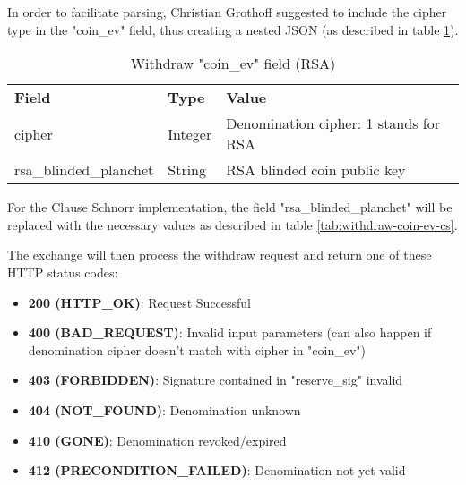 In order to facilitate parsing, Christian Grothoff suggested to include the cipher type in the "coin\_ev" field, thus creating a nested \ac{JSON} (as described in table \ref{tab:withdraw-coin-ev-rsa}).
\begin{table}[ht]
  \centering
  \setupBfhTabular
  \begin{tabular}{lll}
      \rowcolor{BFH-tablehead}
      \textbf{Field} & \textbf{Type} & \textbf{Value} \\
      cipher & Integer & Denomination cipher: 1 stands for RSA \\
      rsa\_blinded\_planchet & String & RSA blinded coin public key \\
  \end{tabular}
  \caption{Withdraw "coin\_ev" field (RSA)}
  \label{tab:withdraw-coin-ev-rsa}
\end{table}

For the Clause Schnorr implementation, the field "rsa\_blinded\_planchet" will be replaced with the necessary values as described in table \ref{tab:withdraw-coin-ev-cs}.
\begin{table}[ht]
  \centering
\end{table}

The exchange will then process the withdraw request and return one of these HTTP status codes:
\begin{itemize}
  \item \textbf{200 (HTTP\_OK)}: Request Successful
  \item \textbf{400 (BAD\_REQUEST)}: Invalid input parameters (can also happen if denomination cipher doesn't match with cipher in "coin\_ev")
  \item \textbf{403 (FORBIDDEN)}: Signature contained in "reserve\_sig" invalid
  \item \textbf{404 (NOT\_FOUND)}: Denomination unknown
  \item \textbf{410 (GONE)}: Denomination revoked/expired
  \item \textbf{412 (PRECONDITION\_FAILED)}: Denomination not yet valid
\end{itemize}


